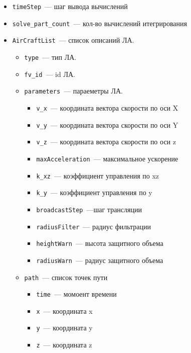 \documentclass[a4paper,12pt]{article}
\numberwithin{figure}{subsubsection}
\begin{document}
\begin{itemize}
    \item \texttt{timeStep}~--- шаг вывода вычислений
    \item \texttt{solve\_part\_count}~--- кол-во вычислений итегрирования
    \item \texttt{AirCraftList}~--- список описаний ЛА.
    \begin{itemize}
        \item \texttt{type}~--- тип ЛА.
        \item \texttt{fv\_id}~---  id ЛА.
        \item \texttt{parameters}~--- параеметры ЛА.
        \begin{itemize}
            \item  \texttt{v\_x}~--- координата вектора скорости по оси X
            \item  \texttt{v\_y}~--- координата вектора скорости по оси Y
            \item  \texttt{v\_z}~--- координата вектора скорости по оси z
            \item \texttt{maxAcceleration}~--- максимальное ускорение
            \item\texttt{k\_xz}~--- коэффициент управления по xz
            \item\texttt{k\_y}~--- коэффициент управления по y
            \item\texttt{broadcastStep}~---шаг трансляции
            \item\texttt{radiusFilter}~--- радиус фильтрации
            \item\texttt{heightWarn}~--- высота защитного объема 
            \item\texttt{radiusWarn}~--- радиус защитного объема
        \end{itemize}
        \item \texttt{path}~--- список точек пути
        \begin{itemize}
            \item \texttt{time}~--- момоент времени
            \item \texttt{x}~--- координата x
            \item \texttt{y}~--- координата y
            \item\texttt{z}~--- координата z
        \end{itemize}
    \end{itemize}
\end{itemize}
\end{document}
